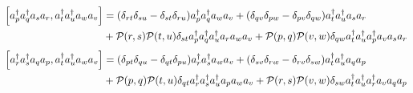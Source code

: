 \documentclass[prb,amsmath,amsfonts,amssymb]{revtex4}
\begin{document}
\begin{align}
	\left[a^\dag_p a^\dag_q a_s a_r, a^\dag_t a^\dag_u a_w a_v\right]	
	&= (\delta_{rt} \delta_{su} - \delta_{st} \delta_{ru}) a^\dag_p a^\dag_q a_w a_v +(\delta_{qv} \delta_{pw}-\delta_{pv }\delta_{qw}) a_t^\dag a_u^\dag    a_s 	a_r \nonumber\\ 
	&+{\cal P}(r,s) {\cal P}(t,u) \delta_{st}  a^\dag_p a^\dag_q a^\dag_u a_r  a_w a_v 
	+{\cal P}(p,q){\cal P}(v,w)\delta_{qw}a_t^\dag a_u^\dag a_p^\dag a_v  a_s 	a_r\end{align}
\fi
{}	
\begin{align}
	\left[a^\dag_r a^\dag_s a_q a_p, a^\dag_t a^\dag_u a_w a_v\right]	
	&= (\delta_{pt} \delta_{qu} - \delta_{qt} \delta_{pu}) a^\dag_r a^\dag_s a_w a_v +(\delta_{sv} \delta_{rw}-\delta_{rv }\delta_{sw}) a_t^\dag a_u^\dag    a_q 	a_p \nonumber\\ 
	&+{\cal P}(p,q) {\cal P}(t,u) \delta_{qt}  a^\dag_r a^\dag_s a^\dag_u a_p  a_w a_v 
	+{\cal P}(r,s){\cal P}(v,w)\delta_{sw}a_t^\dag a_u^\dag a_r^\dag a_v  a_q 	a_p\end{align}	
\fi
\end{document}
